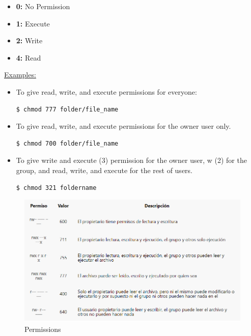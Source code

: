 \documentclass{article}
\newenvironment{codetemplate}[1][]{%
  \mybasecolorbox[#1]
  \itshape
}{%
  \endmybasecolorbox
}
\begin{document}
\begin{itemize}
    \item \textbf{0:} No Permission
    \item \textbf{1:} Execute
    \item \textbf{2:} Write
    \item \textbf{4:} Read
\end{itemize}

\underline{Examples:}

\begin{itemize}
    \item To give read, write, and execute permissions for everyone:
\begin{codetemplate}{}
\begin{verbatim}
$ chmod 777 folder/file_name
\end{verbatim}
\end{codetemplate}

    \item To give read, write, and execute permissions for the owner user only.
\begin{codetemplate}{}
\begin{verbatim}
$ chmod 700 folder/file_name
\end{verbatim}
\end{codetemplate}

    \item To give write and execute (3) permission for the owner user, w (2) for the group, and read, write, and execute for the rest of users.
\begin{codetemplate}{}
\begin{verbatim}
$ chmod 321 foldername
\end{verbatim}
\end{codetemplate}
\end{itemize}

\begin{figure}[H]
    \centering
    \includegraphics[scale=0.55]{pictures/chmod.PNG}
    \caption{Permissions}
    \label{chmod}
\end{figure}
\end{document}
